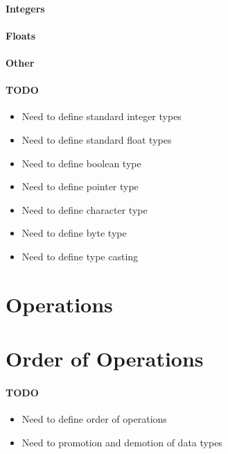 \documentclass{report}
\begin{document}
		\paragraph{Integers}
		\paragraph{Floats}
		\paragraph{Other}
		\paragraph{\color{red}TODO}
			\color{red}
			\begin{itemize}
				\item Need to define standard integer types
				\item Need to define standard float types
				\item Need to define boolean type
				\item Need to define pointer type
				\item Need to define character type
				\item Need to define byte type
				\item Need to define type casting
			\end{itemize}
			\color{black}
	\section{Operations}
		


	\section{Order of Operations}

		\paragraph{\color{red}TODO}
			\color{red}
			\begin{itemize}
				\item Need to define order of operations
				\item Need to promotion and demotion of data types
			\end{itemize}
			\color{black}
\end{document}

